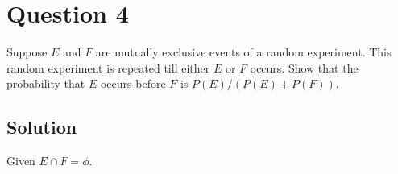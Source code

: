 \section*{Question 4}

Suppose \(E\) and \(F\) are mutually exclusive events of a random experiment.
This random experiment is repeated till either \(E\) or \(F\) occurs.
Show that the probability that \(E\) occurs before \(F\) is \( P(E) / (P(E) + P(F)) \).

\subsection*{Solution}

Given \( E \cap F = \phi \).
